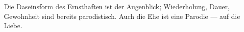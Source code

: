 Die Daseinsform des Ernsthaften ist der Augenblick; Wiederholung, Dauer, Gewohnheit sind bereits parodistisch. Auch die Ehe ist eine Parodie — auf die Liebe.
\par

